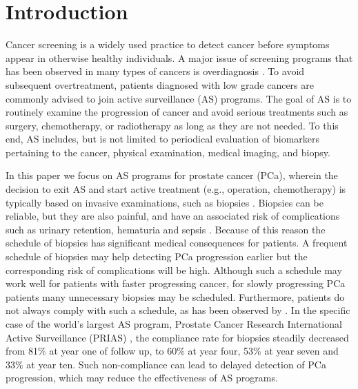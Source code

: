 \section{Introduction}
\label{sec : introduction}
Cancer screening is a widely used practice to detect cancer before symptoms appear in otherwise healthy individuals. A major issue of screening programs that has been observed in many types of cancers is overdiagnosis \citep{esserman2014addressing}. To avoid subsequent overtreatment, patients diagnosed with low grade cancers are commonly advised to join active surveillance (AS) programs. The goal of AS is to routinely examine the progression of cancer and avoid serious treatments such as surgery, chemotherapy, or radiotherapy as long as they are not needed. To this end, AS includes, but is not limited to periodical evaluation of biomarkers pertaining to the cancer, physical examination, medical imaging, and biopsy.

In this paper we focus on AS programs for prostate cancer (PCa), wherein the decision to exit AS and start active treatment (e.g., operation, chemotherapy) is typically based on invasive examinations, such as biopsies \citep{bokhorst2016decade}. Biopsies can be reliable, but they are also painful, and have an associated risk of complications such as urinary retention, hematuria and sepsis \citep{loeb2013systematic}. Because of this reason the schedule of  biopsies has significant medical consequences for patients. A frequent schedule of biopsies may help detecting PCa progression earlier but the corresponding risk of complications will be high. Although such a schedule may work well for patients with faster progressing cancer, for slowly progressing PCa patients many unnecessary biopsies may be scheduled. Furthermore, patients do not always comply with such a schedule, as has been observed by \citet{bokhorst2015compliance}. In the specific case of the world's largest AS program, Prostate Cancer Research International Active Surveillance (PRIAS) \citep{bokhorst2016decade}, the compliance rate for biopsies steadily decreased from 81\% at year one of follow up, to 60\% at year four, 53\% at year seven and 33\% at year ten. Such non-compliance can lead to delayed detection of PCa progression, which may reduce the effectiveness of AS programs.

